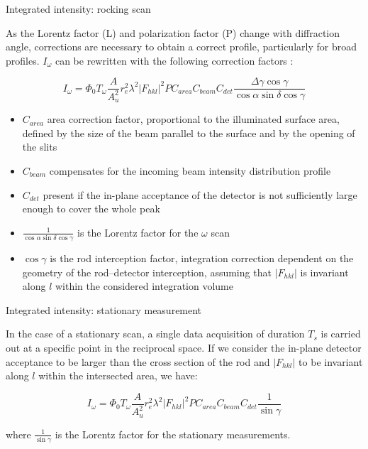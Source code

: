 \begin{frame}{Integrated intensity: rocking scan}

    As the Lorentz factor (L) and polarization factor (P) change with diffraction angle, corrections are necessary to obtain a correct profile, particularly for broad profiles.
    $I_\omega$ can be rewritten with the following correction factors \footnotemark:
    
    \begin{equation}
        I_\omega = \Phi_0 T_\omega \frac{A}{A_u^2} r_e^2 \lambda^2 |F_{hkl}|^2 P C_{area} C_{beam} C_{det} \frac{\Delta\gamma \cos \gamma}{\cos \alpha \sin \delta \cos \gamma}
    \end{equation}
    
    \begin{itemize}
        \item $C_{area}$ area correction factor, proportional to the illuminated surface area, defined by the size of the beam parallel to the surface and by the opening of the slits
        \item $C_{beam}$ compensates for the incoming beam intensity distribution profile
        \item $C_{det}$ present if the in-plane acceptance of the detector is not sufficiently large enough to cover the whole peak
        \item $\frac{1}{\cos \alpha \sin \delta \cos \gamma}$ is the Lorentz factor for the $\omega$ scan
        \item $\cos \gamma$ is the rod interception factor, integration correction dependent on the geometry of the rod–detector interception, assuming that $|F_{hkl}|$ is invariant along $l$ within the considered integration volume
    \end{itemize}
    

\end{frame}

\begin{frame}{Integrated intensity: stationary measurement}

    In the case of a stationary scan, a single data acquisition of duration $T_s$ is carried out at a specific point in the reciprocal space.
    If we consider the in-plane detector acceptance to be larger than the cross section of the rod and $|F_{hkl}|$ to be invariant along $l$ within the intersected area, we have:
    
    \begin{equation}
        I_\omega = \Phi_0 T_\omega \frac{A}{A_u^2} r_e^2 \lambda^2 |F_{hkl}|^2 P C_{area} C_{beam} C_{det} \frac{1}{\sin \gamma}
    \end{equation}
    
    where $\frac{1}{\sin \gamma }$ is the Lorentz factor for the stationary measurements\footnotemark.
    
\end{frame}


